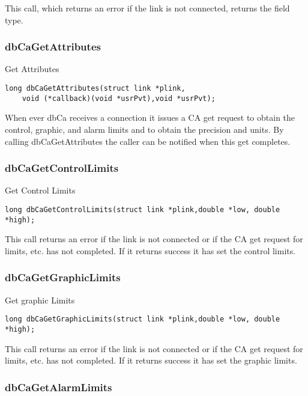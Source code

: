 This call, which returns an error if the link is not connected, returns the field type.

\subsubsection{dbCaGetAttributes}

Get Attributes

\begin{verbatim}
long dbCaGetAttributes(struct link *plink,
    void (*callback)(void *usrPvt),void *usrPvt);
\end{verbatim}

When ever dbCa receives a connection it issues a CA get request to obtain the control, graphic, and alarm limits and to 
obtain the precision and units. By calling dbCaGetAttributes the caller can be notified when this get completes.

\subsubsection{dbCaGetControlLimits}

Get Control Limits

\begin{verbatim}
long dbCaGetControlLimits(struct link *plink,double *low, double *high);
\end{verbatim}

This call returns an error if the link is not connected or if the CA get request for limits, etc. has not completed. If it returns 
success it has set the control limits.

\subsubsection{dbCaGetGraphicLimits}

Get graphic Limits

\begin{verbatim}
long dbCaGetGraphicLimits(struct link *plink,double *low, double *high);
\end{verbatim}

This call returns an error if the link is not connected or if the CA get request for limits, etc. has not completed. If it returns 
success it has set the graphic limits.

\subsubsection{dbCaGetAlarmLimits}

